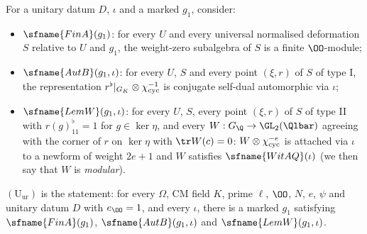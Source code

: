 \begin{definition}\label{pf:modularity:Uur}
For a unitary datum $D$, $\iota$ and a marked $g_1$, consider:
\begin{itemize}
\item $\sfname{FinA}(g_1)$: for every $U$ and every universal normalised deformation $S$ relative to $U$ and $g_1$, the
weight-zero subalgebra of $S$ is a finite $\OO$-module;
\item $\sfname{AutB}(g_1,\iota)$: for every $U$, $S$ and every point $(\xi,r)$ of $S$ of type I, the representation
$r^\flat|_{G_K}\otimes\chi_{\mathrm{cyc}}^{-1}$ is conjugate self-dual automorphic via $\iota$;
\item $\sfname{LemW}(g_1,\iota)$: for every $U$, $S$, every point $(\xi,r)$ of $S$ of type II with $r(g)^\flat_{11}=1$
for $g\in\ker\eta$, and every $W:G_\Q\to\GL_2(\Qlbar)$ agreeing with the corner of $r$ on $\ker\eta$ with
$\tr W(c)=0$: $W\otimes\chi_{\mathrm{cyc}}^{-e}$ is attached via $\iota$ to a newform of weight $2e+1$ and $W$ satisfies
$\sfname{WitAQ}(\iota)$ (we then say that $W$ is \emph{modular}).
\end{itemize}
$(\mathrm{U}_{\mathrm{ur}})$ is the statement: for every $\Omega$, CM field $K$, prime $\ell$, $\OO$, $N$, $e$, $\psi$
and unitary datum $D$ with $e_\OO=1$, and every $\iota$, there is a marked $g_1$ satisfying $\sfname{FinA}(g_1)$,
$\sfname{AutB}(g_1,\iota)$ and $\sfname{LemW}(g_1,\iota)$.
\end{definition}

